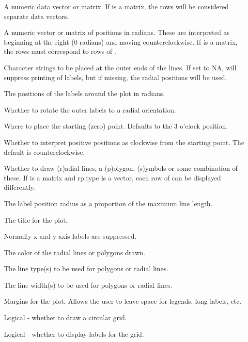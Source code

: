 \begin{Arguments}
\begin{ldescription}
\item[\code{lengths}] A numeric data vector or matrix. If 
is a matrix, the rows will be considered separate data vectors.
\item[\code{radial.pos}] A numeric vector or matrix of positions in radians. 
These are interpreted as beginning at the right (0 radians) and moving
counterclockwise. If  is a matrix, the rows must 
correspond to rows of .
\item[\code{labels}] Character strings to be placed at the outer ends of
the lines. If set to NA, will suppress printing of labels,
but if missing, the radial positions will be used.
\item[\code{label.pos}] The positions of the labels around the plot in radians.
\item[\code{radlab}] Whether to rotate the outer labels to a radial orientation.
\item[\code{start}] Where to place the starting (zero) point. Defaults to the
3 o'clock position.
\item[\code{clockwise}] Whether to interpret positive positions as clockwise from
the starting point. The default is counterclockwise.
\item[\code{rp.type}] Whether to draw (r)adial lines, a (p)olygon, (s)ymbols
or some combination of these. If  is a matrix and rp.type is
a vector, each row of  can be displayed differently.
\item[\code{label.prop}] The label position radius as a proportion of the 
maximum line length.
\item[\code{main}] The title for the plot.
\item[\code{xlab,ylab}] Normally x and y axis labels are suppressed.
\item[\code{line.col}] The color of the radial lines or polygons drawn.
\item[\code{lty}] The line type(s) to be used for polygons or radial lines.
\item[\code{lwd}] The line width(s) to be used for polygons or radial lines.
\item[\code{mar}] Margins for the plot. Allows the user to leave space for
legends, long labels, etc.
\item[\code{show.grid}] Logical - whether to draw a circular grid.
\item[\code{show.grid.labels}] Logical - whether to display labels for the grid.

\end{ldescription}
\end{Arguments}
